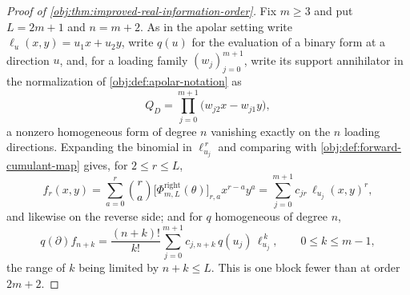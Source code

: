 \begin{proof}[Proof of \cref{obj:thm:improved-real-information-order}]
Fix \(m\ge 3\) and put \(L=2m+1\) and \(n=m+2\).  As in the apolar setting write \(\ell_u(x,y)=u_1x+u_2y\), write \(q(u)\) for the evaluation of a binary form at a direction \(u\), and, for a loading family \((w_j)_{j=0}^{m+1}\), write its support annihilator in the normalization of \cref{obj:def:apolar-notation} as
\[
Q_D=\prod_{j=0}^{m+1}\bigl(w_{j2}x-w_{j1}y\bigr),
\]
a nonzero homogeneous form of degree \(n\) vanishing exactly on the \(n\) loading directions.  Expanding the binomial in \(\ell_{u_j}^{\,r}\) and comparing with \cref{obj:def:forward-cumulant-map} gives, for \(2\le r\le L\),
\[
f_r(x,y)=\sum_{a=0}^{r}\binom{r}{a}\bigl[\Phi^{\mathrm{right}}_{m,L}(\theta)\bigr]_{r,a}x^{r-a}y^{a}
=\sum_{j=0}^{m+1}c_{jr}\,\ell_{u_j}(x,y)^{r},
\]
and likewise on the reverse side; and for \(q\) homogeneous of degree \(n\),
\[
q(\partial)f_{n+k}=\frac{(n+k)!}{k!}\sum_{j=0}^{m+1}c_{j,n+k}\,q(u_j)\,\ell_{u_j}^{\,k},
\qquad 0\le k\le m-1 ,
\]
the range of \(k\) being limited by \(n+k\le L\).  This is one block fewer than at order \(2m+2\).


\end{proof}
